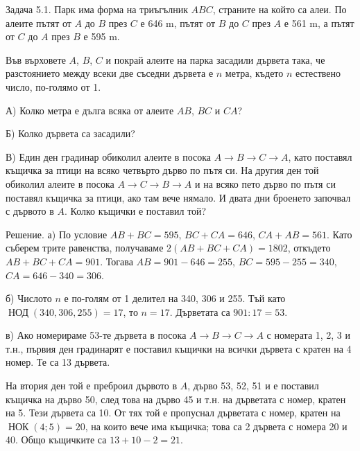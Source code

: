 
Задача 5.1. Парк има форма на триъгълник $ABC$, страните на който са алеи. По алеите пътят от $A$ до $B$ през $C$ е 646 m, пътят от $B$ до $C$ през $A$ е 561 m, а пътят от $C$ до $A$ през $B$ е 595 m.

Във върховете $A$, $B$, $C$ и покрай алеите на парка засадили дървета така, че разстоянието между всеки две съседни дървета е $n$ метра, където $n$ естествено число, по-голямо от 1.

А) Колко метра е дълга всяка от алеите $AB$, $BC$ и $CA$?

Б) Колко дървета са засадили?

В) Един ден градинар обиколил алеите в посока $A\to B\to C\to A$, като поставял къщичка за птици на всяко четвърто дърво по пътя си. На другия ден той обиколил алеите в посока $A\to C\to B\to A$ и на всяко пето дърво по пътя си поставял къщичка за птици, ако там вече нямало. И двата дни броенето започвал с дървото в $A$. Колко къщички е поставил той?

Решение. а) По условие $AB+BC=595$, $BC+CA=646$, $CA+AB=561$. Като съберем трите равенства, получаваме $2(AB+BC+CA)=1802$, откъдето $AB+BC+CA=901$. Тогава $AB=901-646=255$, $BC=595-255=340$, $CA=646-340=306$.

б) Числото $n$ е по-голям от 1 делител на 340, 306 и 255. Тъй като $\operatorname{НОД}(340,306,255)=17$, то $n=17$. Дърветата са $901:17=53$.

в) Ако номерираме 53-те дървета в посока $A\to B\to C\to A$ с номерата 1, 2, 3 и т.н., първия ден градинарят е поставил къщички на всички дървета с кратен на 4 номер. Те са 13 дървета.

На втория ден той е преброил дървото в $A$, дърво 53, 52, 51 и е поставил къщичка на дърво 50, след това на дърво 45 и т.н. на дърветата с номер, кратен на 5. Тези дървета са 10. От тях той е пропуснал дърветата с номер, кратен на $\operatorname{НОК}(4;5)=20$, на които вече има къщичка; това са 2 дървета с номера 20 и 40. Общо къщичките са $13+10-2=21$.

